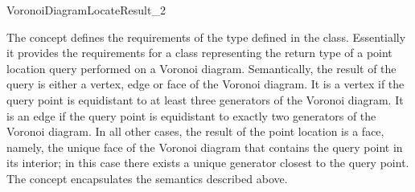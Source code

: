 


\begin{ccRefConcept}{VoronoiDiagramLocateResult_2}

\ccDefinition

The concept  defines the requirements of the
 type defined in the 
class. Essentially it provides the requirements for a class
representing the return type of a point location query performed on a
Voronoi diagram. Semantically, the result of the query is either a
vertex, edge or face of the Voronoi diagram. It is a vertex if the
query point is equidistant to at least three generators of the Voronoi
diagram. It is an edge if the query point is equidistant to exactly
two generators of the Voronoi diagram. In all other cases, the result
of the point location is a face, namely, the unique face of the
Voronoi diagram that contains the query point in its interior; in this
case there exists a unique generator closest to the query point. The
 concept encapsulates the 
semantics described above.

\ccRefines
{}\\
\\
\\

\ccTypes
{}
\ccThreeToTwo
%
\ccGlue
{}
\ccGlue
{}


\end{ccRefConcept}
